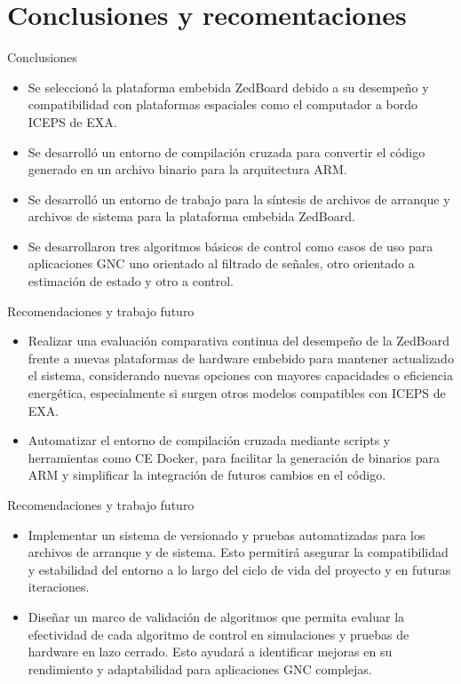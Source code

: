 \documentclass[10pt,aspectratio=169]{beamer} %
\begin{document}
\section{Conclusiones y recomentaciones}

\begin{frame}{Conclusiones}
  \begin{itemize}
    \item Se seleccionó la plataforma embebida ZedBoard debido a su desempeño y compatibilidad con plataformas espaciales como el computador a bordo ICEPS de EXA.
    \item Se desarrolló un entorno de compilación cruzada para convertir el código generado en un archivo binario para la arquitectura ARM.
    \item Se desarrolló un entorno de trabajo para la síntesis de archivos de arranque y archivos de sistema para la plataforma embebida ZedBoard.
    \item Se desarrollaron tres algoritmos básicos  de control como casos de uso para aplicaciones GNC uno orientado al filtrado de señales, otro orientado a estimación de estado y otro a control.
  \end{itemize}
\end{frame}

\begin{frame}{Recomendaciones y trabajo futuro}
  \begin{itemize}
    \item Realizar una evaluación comparativa continua del desempeño de la ZedBoard frente a nuevas plataformas de hardware embebido para mantener actualizado el sistema, considerando nuevas opciones con mayores capacidades o eficiencia energética, especialmente si surgen otros modelos compatibles con ICEPS de EXA.
    \item Automatizar el entorno de compilación cruzada mediante scripts y herramientas como CE Docker, para facilitar la generación de binarios para ARM y simplificar la integración de futuros cambios en el código.
  \end{itemize}
\end{frame}

\begin{frame}{Recomendaciones y trabajo futuro}
  \begin{itemize}
    \item Implementar un sistema de versionado y pruebas automatizadas para los archivos de arranque y de sistema. Esto permitirá asegurar la compatibilidad y estabilidad del entorno a lo largo del ciclo de vida del proyecto y en futuras iteraciones.
    \item Diseñar un marco de validación de algoritmos que permita evaluar la efectividad de cada algoritmo de control en simulaciones y pruebas de hardware en lazo cerrado. Esto ayudará a identificar mejoras en su rendimiento y adaptabilidad para aplicaciones GNC complejas.
  \end{itemize}
\end{frame}
\end{document}
